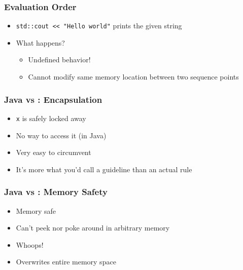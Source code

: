 \begin{frame}
  \frametitle{Evaluation Order}
  \begin{itemize}
    \item \texttt{std::cout << "Hello world"} prints the given string
    \item What happens?
          \begin{itemize}
            \item<2> Undefined behavior!
            \item<2> Cannot modify same memory location between two sequence points
          \end{itemize}
  \end{itemize}
\end{frame}

\begin{frame}
  \frametitle{Java vs \cpp: Encapsulation}
  \begin{itemize}
    \item \texttt{x} is safely locked away
    \item No way to access it (in Java)
  \end{itemize}
  \vskip2mm
  \structure{\cpp}
  \begin{itemize}
    \item Very easy to circumvent
    \item It's more what you'd call a guideline than an actual rule
  \end{itemize}
\end{frame}

\begin{frame}
  \frametitle{Java vs \cpp: Memory Safety}
  \begin{itemize}
    \item Memory safe
    \item Can't peek nor poke around in arbitrary memory
  \end{itemize}
  \vskip2mm
  \structure{\cpp}
  \begin{itemize}
    \item Whoops!
    \item Overwrites entire memory space
  \end{itemize}
\end{frame}

